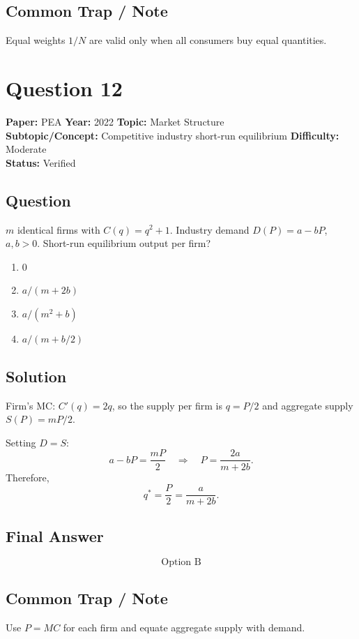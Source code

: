 \documentclass[11pt]{article}
\begin{document}
\subsection*{Common Trap / Note}
Equal weights $1/N$ are valid only when all consumers buy equal quantities.

\section*{Question 12}
\textbf{Paper:} PEA \quad \textbf{Year:} 2022 \quad \textbf{Topic:} Market Structure \\
\textbf{Subtopic/Concept:} Competitive industry short-run equilibrium \quad \textbf{Difficulty:} Moderate \\
\textbf{Status:} Verified

\subsection*{Question}
$m$ identical firms with $C(q) = q^2 + 1$. Industry demand $D(P) = a - bP$, $a,b > 0$.
Short-run equilibrium output per firm?
\begin{enumerate}[label=(\Alph*)]
\item $0$
\item $a/(m + 2b)$
\item $a/(m^2 + b)$
\item $a/(m + b/2)$
\end{enumerate}

\subsection*{Solution}
Firm's MC: $C'(q) = 2q$, so the supply per firm is $q = P/2$ and aggregate supply
$S(P) = mP/2$.

Setting $D = S$:
\[
a - bP = \frac{mP}{2} \quad \Longrightarrow \quad P = \frac{2a}{m + 2b}.
\]
Therefore,
\[
q^* = \frac{P}{2} = \frac{a}{m + 2b}.
\]

\subsection*{Final Answer}
\[
\boxed{\text{Option B}}
\]

\subsection*{Common Trap / Note}
Use $P = MC$ for each firm and equate aggregate supply with demand.
\end{document}
